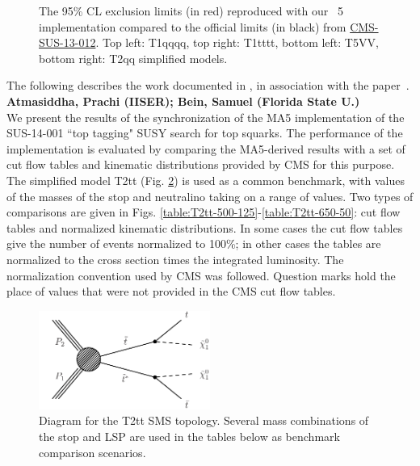 \begin{figure}
\caption{The 95\% CL exclusion limits (in red) reproduced with our {}~5 implementation compared to the official limits (in black) from \href{https://twiki.cern.ch/twiki/bin/view/CMSPublic/PhysicsResultsSUS13012}{CMS-SUS-13-012}. Top left: T1qqqq, top right: T1tttt, bottom left: T5VV, bottom right: T2qq simplified models.
\label{fig:limitplots}}
        \end{figure} 
\FloatBarrier


The following describes the work documented in \cite{MA5-CMS-SUS-14-001}, in association with the paper~\cite{MA5-CMS-SUS-14-001}.
\textbf{Atmasiddha, Prachi (IISER); Bein, Samuel (Florida State U.)}\\
We present the results of the synchronization of the MA5
implementation of the SUS-14-001 ``top tagging" SUSY search for top squarks.  The
performance of the implementation is evaluated by comparing the
MA5-derived results with a set of cut flow tables and kinematic
distributions provided by CMS for this purpose. The simplified model
T2tt (Fig. \ref{fig:T2tt}) is used as a common benchmark, with values of the masses of the
stop and neutralino taking on a range of values. Two types of
comparisons are given in 
Figs. \ref{table:T2tt-500-125}-\ref{table:T2tt-650-50}: cut flow tables and normalized
kinematic distributions. In some cases the
cut flow tables give the number of events normalized to 100\%; in
other cases the tables are normalized to the cross section times the
integrated luminosity. The normalization convention used by CMS was
followed. Question marks hold the place of values that were not
provided in the CMS cut flow tables.
   \begin{figure}
  \centering
    \includegraphics[width=0.5\textwidth]{figures/Appendices/Ma5ValidationSUS13012/T2tt.pdf}
      \caption{Diagram for the T2tt SMS topology. Several mass
        combinations of the stop and LSP are used in the tables below
        as benchmark comparison scenarios.}
      \label{fig:T2tt}
\end{figure}

